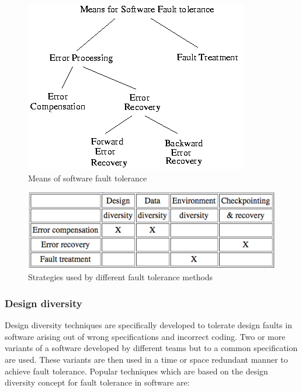 \documentclass[a4paper, 11pt]{article}
\begin{document}
\begin{figure}[htbp]
	\centering
	\includegraphics[width=0.6\linewidth]{images/img3.png}
	\caption{Means of software fault tolerance}
\end{figure}

\begin{figure}[htbp]
	\centering
	\includegraphics[width=0.6\linewidth]{images/table1.png}
	\caption{Strategies used by different fault tolerance methods}
\end{figure}

\subsubsection{Design diversity}
Design diversity techniques are specifically developed to tolerate design faults in software arising out of wrong specifications and incorrect coding. Two or more variants of a software developed by different teams but to a common specification are used. These variants are then used in a time or space redundant manner to achieve fault tolerance. Popular techniques which are based on the design diversity concept for fault tolerance in software are:
\end{document}
